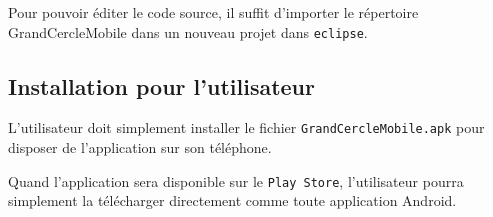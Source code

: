 \documentclass[a4paper, 11px]{article}
\begin{document}
Pour pouvoir éditer le code source, il suffit d'importer le répertoire GrandCercleMobile dans un nouveau projet dans \texttt{eclipse}.
\subsection{Installation pour l'utilisateur}
L'utilisateur doit simplement installer le fichier \texttt{GrandCercleMobile.apk} pour disposer de l'application sur son téléphone.

Quand l'application sera disponible sur le \texttt{Play Store}, l'utilisateur pourra simplement la télécharger directement comme toute application Android.
\end{document}
